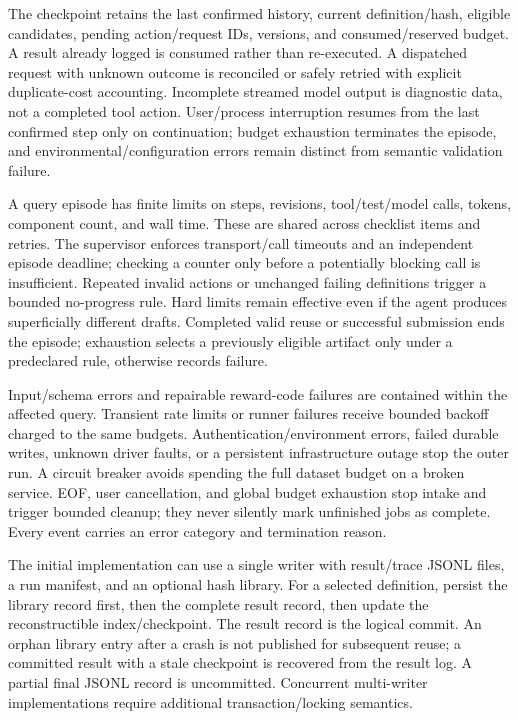 The checkpoint retains the last confirmed history, current definition/hash, eligible candidates, pending action/request IDs, versions, and consumed/reserved budget. A result already logged is consumed rather than re-executed. A dispatched request with unknown outcome is reconciled or safely retried with explicit duplicate-cost accounting. Incomplete streamed model output is diagnostic data, not a completed tool action. User/process interruption resumes from the last confirmed step only on continuation; budget exhaustion terminates the episode, and environmental/configuration errors remain distinct from semantic validation failure.

A query episode has finite limits on steps, revisions, tool/test/model calls, tokens, component count, and wall time. These are shared across checklist items and retries. The supervisor enforces transport/call timeouts and an independent episode deadline; checking a counter only before a potentially blocking call is insufficient. Repeated invalid actions or unchanged failing definitions trigger a bounded no-progress rule. Hard limits remain effective even if the agent produces superficially different drafts. Completed valid reuse or successful submission ends the episode; exhaustion selects a previously eligible artifact only under a predeclared rule, otherwise records failure.

Input/schema errors and repairable reward-code failures are contained within the affected query. Transient rate limits or runner failures receive bounded backoff charged to the same budgets. Authentication/environment errors, failed durable writes, unknown driver faults, or a persistent infrastructure outage stop the outer run. A circuit breaker avoids spending the full dataset budget on a broken service. EOF, user cancellation, and global budget exhaustion stop intake and trigger bounded cleanup; they never silently mark unfinished jobs as complete. Every event carries an error category and termination reason.

The initial implementation can use a single writer with result/trace JSONL files, a run manifest, and an optional hash library. For a selected definition, persist the library record first, then the complete result record, then update the reconstructible index/checkpoint. The result record is the logical commit. An orphan library entry after a crash is not published for subsequent reuse; a committed result with a stale checkpoint is recovered from the result log. A partial final JSONL record is uncommitted. Concurrent multi-writer implementations require additional transaction/locking semantics.


